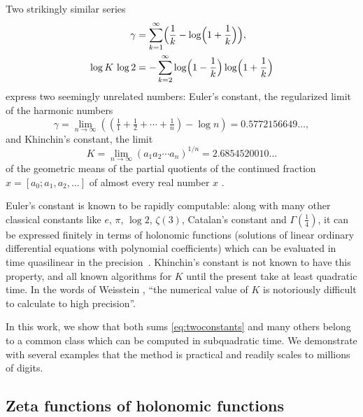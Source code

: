 \documentclass[11pt,reqno]{amsart}
\theoremstyle{definition}
\theoremstyle{remark}
\begin{document}
Two strikingly similar series
\begin{equation}
\label{eq:twoconstants}
\begin{aligned}
  \gamma &= \sum_{k=1}^{\infty}\Bigl(\frac1k - \log\Bigl(1+\frac1k\Bigr)\Bigr), \\
  \log K\,\log 2 &= -\sum_{k=2}^{\infty}\log\Bigl(1-\frac1k\Bigr)\log\Bigl(1+\frac1k\Bigr)
\end{aligned}
\end{equation}
express two seemingly unrelated numbers: Euler's constant, the regularized limit of the harmonic numbers
\[
\gamma = \lim_{n \to \infty} ( ( \tfrac{1}{1} + \tfrac{1}{2} + \cdots + \tfrac{1}{n} ) - \log n) = 0.5772156649\ldots,
\]
and Khinchin's constant, the limit
\[
  K = \lim_{n\to\infty}(a_1a_2\cdots a_n)^{1/n} = 2.6854520010\ldots
\]
of the geometric means of the partial quotients of the continued fraction $x = [a_0; a_1, a_2, \dots]$ of almost
every real number $x$ \cite{Khi35,Khi64}.

Euler's constant is known to be rapidly computable: along with many other classical constants
like $e$, $\pi$, $\log 2$, $\zeta(3)$, Catalan's constant and $\Gamma(\frac14)$,
it can be expressed finitely in terms of holonomic functions (solutions
of linear ordinary differential equations with polynomial
coefficients)
which can be evaluated in time quasilinear in the precision~\cite{BB87,HP98,BM80,BZ10,CC90,vdH99}.
Khinchin's constant is not known to have this property,
and all known algorithms for $K$ until the present take at least quadratic time.
In the words of Weisstein \cite{MWKdigits}, ``the numerical value of $K$ is
notoriously difficult to calculate to high precision''.

In this work, we show that both sums \eqref{eq:twoconstants} and many others
belong to a common class which can be computed in subquadratic time.
We demonstrate with several examples that the method is practical
and readily scales to millions of digits.

\subsection{Zeta functions of holonomic functions}
\end{document}

